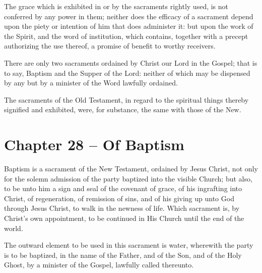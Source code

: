 \begin{outerlst}[left=0pt,labelsep=0pt]
\begin{innerlst}[resume*]
\item The grace which is exhibited in or by the sacraments rightly used, is not conferred by any power in them; neither does the efficacy of a sacrament depend upon the piety or intention of him that does administer it: but upon the work of the Spirit, and the word of institution, which contains, together with a precept authorizing the use thereof, a promise of benefit to worthy receivers.   

\item There are only two sacraments ordained by Christ our Lord in the Gospel; that is to say, Baptism and the Supper of the Lord: neither of which may be dispensed by any but by a minister of the Word lawfully ordained.   

\item The sacraments of the Old Testament, in regard to the spiritual things thereby signified and exhibited, were, for substance, the same with those of the New.  
\end{innerlst}

\item
{}
\section{Chapter 28 -- Of Baptism}
\begin{innerlst}[resume*]

\item Baptism is a sacrament of the New Testament, ordained by Jesus Christ, not only for the solemn admission of the party baptized into the visible Church; but also, to be unto him a sign and seal of the covenant of grace, of his ingrafting into Christ, of regeneration, of remission of sins, and of his giving up unto God through Jesus Christ, to walk in the newness of life. Which sacrament is, by Christ's own appointment, to be continued in His Church until the end of the world.   

\item The outward element to be used in this sacrament is water, wherewith the party is to be baptized, in the name of the Father, and of the Son, and of the Holy Ghost, by a minister of the Gospel, lawfully called thereunto.   


\end{innerlst}
\end{outerlst}
